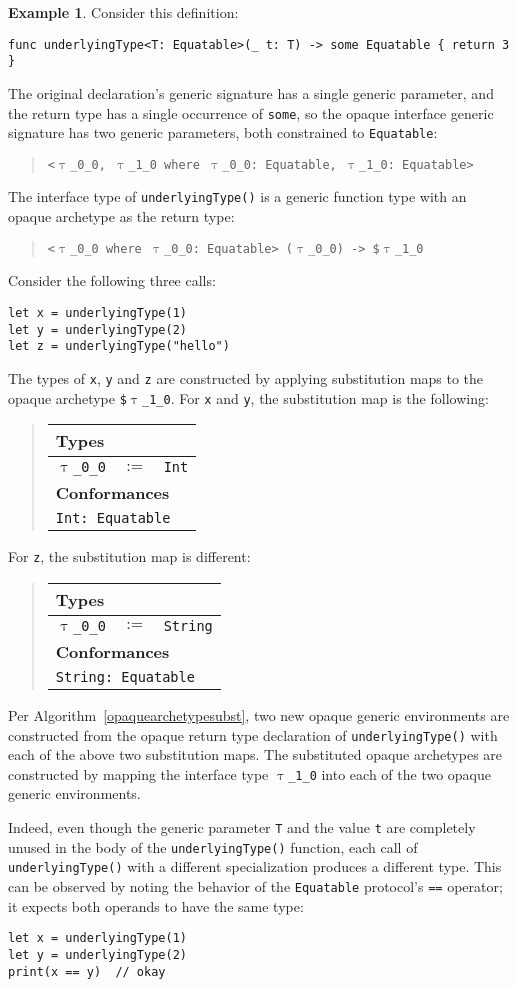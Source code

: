 \documentclass[a4paper,headsepline,bibliography=totoc,toc=flat,fleqn,twoside=semi]{scrbook}
\theoremstyle{definition}
\theoremstyle{definition}
\newtheorem{example}{Example}[chapter]
\theoremstyle{definition}
\newcommand{\ttgp}[2]{\texttt{$\uptau$\_#1\_#2}}
\newcommand{\SubMapC}[2]{\begin{tabular}{|lll|}
\hline
\multicolumn{3}{|l|}{\textbf{Types}}\\
\hline
#1\\
\hline
\hline
\multicolumn{3}{|l|}{\textbf{Conformances}}\\
\hline
#2\\
\hline
\end{tabular}}
\newcommand{\SubType}[2]{\texttt{#1}&$:=$&\texttt{#2}}
\newcommand{\SubConf}[1]{\multicolumn{3}{|l|}{\texttt{#1}}}
\begin{document}
\begin{example} Consider this definition:
\begin{Verbatim}
func underlyingType<T: Equatable>(_ t: T) -> some Equatable { return 3 }
\end{Verbatim}
The original declaration's generic signature has a single generic parameter, and the return type has a single occurrence of \texttt{some}, so the opaque interface generic signature has two generic parameters, both constrained to \texttt{Equatable}:
\begin{quote}
\texttt{<\ttgp{0}{0}, \ttgp{1}{0} where \ttgp{0}{0}:\ Equatable, \ttgp{1}{0}:\ Equatable>}
\end{quote}
The interface type of \texttt{underlyingType()} is a generic function type with an opaque archetype as the return type:
\begin{quote}
\texttt{<\ttgp{0}{0} where \ttgp{0}{0}:\ Equatable> (\ttgp{0}{0}) -> \$\ttgp{1}{0}}
\end{quote}
Consider the following three calls:
\begin{Verbatim}
let x = underlyingType(1)
let y = underlyingType(2)
let z = underlyingType("hello")
\end{Verbatim}
The types of \texttt{x}, \texttt{y} and \texttt{z} are constructed by applying substitution maps to the opaque archetype \texttt{\$\ttgp{1}{0}}. For \texttt{x} and \texttt{y}, the substitution map is the following:
\begin{quote}
\SubMapC{
\SubType{\ttgp{0}{0}}{Int}
}{
\SubConf{Int:\ Equatable}
}
\end{quote}
For \texttt{z}, the substitution map is different:
\begin{quote}
\SubMapC{
\SubType{\ttgp{0}{0}}{String}
}{
\SubConf{String:\ Equatable}
}
\end{quote}
Per Algorithm~\ref{opaquearchetypesubst}, two new opaque generic environments are constructed from the opaque return type declaration of \texttt{underlyingType()} with each of the above two substitution maps. The substituted opaque archetypes are constructed by mapping the interface type \texttt{\ttgp{1}{0}} into each of the two opaque generic environments.

Indeed, even though the generic parameter \texttt{T} and the value \texttt{t} are completely unused in the body of the \texttt{underlyingType()} function, each call of \texttt{underlyingType()} with a different specialization produces a different type. This can be observed by noting the behavior of the \texttt{Equatable} protocol's \texttt{==} operator; it expects both operands to have the same type:
\begin{Verbatim}
let x = underlyingType(1)
let y = underlyingType(2)
print(x == y)  // okay


\end{Verbatim}
\end{example}
\end{document}
